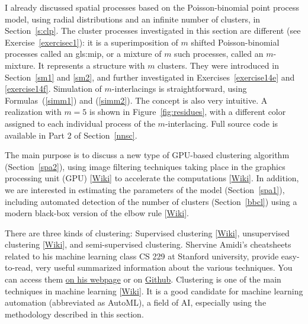 \documentclass[10pt]{article}
\begin{document}
I already discussed \textcolor{index}{spatial processes} based on the Poisson-binomial point process model, using \textcolor{index}{radial distributions} and an infinite number of clusters, in
Section~\ref{s:clp}. The \textcolor{index}{cluster processes} investigated in this section are different (see Exercise~\ref{exercisec1}):
it is a \textcolor{index}{superimposition} of $m$
\textcolor{index}{shifted} Poisson-binomial processes
called an \gls{gls:mip}, or a \textcolor{index}{mixture} of $m$ such processes,
called an \textcolor{index}{$m$-mixture}. It represents a structure with $m$ clusters. They were introduced in Section~\ref{sm1} and \ref{sm2}, and further investigated in Exercises~\ref{exercise14e} and \ref{exercise14f}. Simulation of \textcolor{index}{$m$-interlacings} is straightforward, using Formulas~(\ref{simm1}) and (\ref{simm2}). The concept is also very intuitive. A realization with $m=5$ is shown in Figure~\ref{fig:residues}, with a different color assigned to each individual process of the $m$-interlacing. Full source code is available in Part 2 of Section~\ref{nnsc}.




The main purpose is to discuss a new type of \textcolor{index}{GPU-based clustering algorithm} (Section~\ref{spa2}), using image filtering techniques taking place in the graphics processing unit (GPU)
[\href{https://en.wikipedia.org/wiki/Graphics_processing_unit}{Wiki}] to accelerate the computations [\href{https://en.wikipedia.org/wiki/AI_accelerator}{Wiki}].  In addition, we are interested in estimating the parameters of the model (Section~\ref{spa1}), including automated detection of the number of clusters (Section~\ref{bbcl})
using a modern black-box version of the \textcolor{index}{elbow rule} [\href{https://en.wikipedia.org/wiki/Elbow_method_(clustering)}{Wiki}].

There are three kinds of clustering: \textcolor{index}{Supervised clustering}
[\href{https://en.wikipedia.org/wiki/Supervised_learning}{Wiki}],
 \textcolor{index}{unsupervised clustering} [\href{https://en.wikipedia.org/wiki/Cluster_analysis}{Wiki}], and semi-supervised clustering.
Shervine Amidi's cheatsheets related to his machine learning class CS 229 at Stanford university, provide easy-to-read, very useful summarized information about the various techniques. You can access them \href{https://stanford.edu/~shervine/teaching/cs-229/}{on his webpage} or on \href{https://github.com/afshinea/stanford-cs-229-machine-learning/blob/master/en/cheatsheet-unsupervised-learning.pdf}{Github}.
Clustering is one of the main techniques in machine learning
 [\href{https://en.wikipedia.org/wiki/Machine_learning}{Wiki}]. It is a good candidate for machine learning automation (abbreviated as AutoML), a field of AI, especially using the methodology described in this section.
\end{document}
